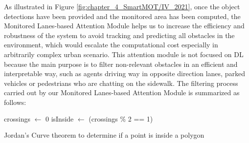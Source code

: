 As illustrated in Figure \ref{fig:chapter_4_SmartMOT/IV_2021}, once the object detections have been provided and the monitored area has been computed, the Monitored Lanes-based Attention Module helps us to increase the efficiency and robustness of the system to avoid tracking and predicting all obstacles in the environment, which would escalate the computational cost especially in arbitrarily complex urban scenario. This attention module is not focused on \ac{DL} because the main purpose is to filter non-relevant obstacles in an efficient and interpretable way, such as agents driving way in opposite direction lanes, parked vehicles or pedestrians who are chatting on the sidewalk. The filtering process carried out by our Monitored Lanes-based Attention Module is summarized as follows:

\begin{algorithm}[h]
	\SetAlgoLined
	crossings $\leftarrow$ 0\;
	isInside $\leftarrow$ (crossings \% 2 == 1)\;
	\;
	\caption{Jordan's Curve theorem to determine if a point is inside a polygon}
	\label{alg:4_jordan_curve_theorem}
\end{algorithm}

